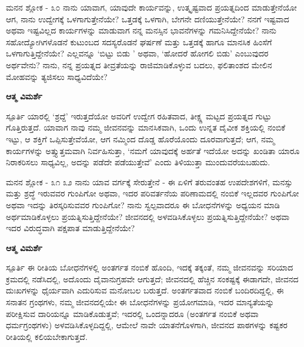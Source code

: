 \newpage
\begin{mananam}{\mananamfont ಮನನ ಶ್ಲೋಕ - ೩೦}
\mananamtext ನಾನು ಯಾವಾಗ, ಯಾವುದೇ ಕಾರ್ಯವನ್ನು, ಉತ್ಕೃಷ್ಟವಾದ ಪ್ರಯತ್ನದಿಂದ ಮಾಡುತ್ತೇನೆಯೋ ಆಗ, ನಾನು ಉದ್ವೇಗಕ್ಕೆ ಒಳಗಾಗುತ್ತೇನೆಯೇ? ಒತ್ತಡಕ್ಕೆ ಒಳಗಾಗಿ, ಬೇಗನೇ ದಣಿಯುತ್ತೇನೆಯೇ? ನನಗೆ ಇಷ್ಟವಾದ ಅಥವಾ ಇಷ್ಟವಿಲ್ಲದ ಕಾರ್ಯಗಳನ್ನು ಮಾಡುವಾಗ ನನ್ನ ಮನಸ್ಸಿನ ಭಾವನೆಗಳನ್ನು ಗಮನಿಸಿದ್ದೇನೆಯೇ? ನಾನು ಸಹೋದ್ಯೋಗಿಗಳೊಡನೆ ಕುಟುಂಬದ ಸದಸ್ಯರೊಡನೆ ಘರ್ಷಣೆ ಮತ್ತು ಒತ್ತಡಕ್ಕೆ ಹಾಗೂ ಮಾನಸಿಕ ಹಿಂಸೆಗೆ ಒಳಗಾಗುತ್ತಿದ್ದೇನೆಯೇ? ಎಲ್ಲವನ್ನೂ ‘ಬಿಟ್ಟು ಬಿಡು ’ ಅಥವಾ, ‘ಹೋದರೆ ಹೋಗಲಿ ಬಿಡು’ ಎಂಬುವುದರ ಅರ್ಥವೇನು? ನಾನು, ನನ್ನ ಪ್ರಯತ್ನದ ತೀವ್ರತೆಯನ್ನು  ರಾಜಿಮಾಡಿಕೊಳ್ಳುವ ಬದಲು, ಫಲಿತಾಂಶದ ಮೇಲಿನ ಮೋಹವನ್ನು ತ್ಯಜಿಸಲು ಸಾಧ್ಯವಿದೆಯೇ? 
\end{mananam}
\WritingHand\enspace\textbf{ಆತ್ಮ ವಿಮರ್ಶೆ}\\
\begin{inspiration}{\mananamfont ಸ್ಪೂರ್ತಿ}
\mananamtext ಯಾರಲ್ಲಿ ‘ಶ್ರದ್ದೆ’ ಇರುತ್ತದೆಯೋ ಅವರಿಗೆ ಉದ್ವೇಗ ರಹಿತವಾದ, ತೀಕ್ಷ್ಣ  ಮಟ್ಟದ ಪ್ರಯತ್ನದ ಗುಟ್ಟು ಗೊತ್ತಿರುತ್ತದೆ. ಯಾವಾಗ ನಾವು ನಮ್ಮ ಜೀವನವನ್ನು ಮಾನಸಿಕವಾಗಿ, ಒಂದು ಉನ್ನತ ದೈವೀಕ ಶಕ್ತಿಯಲ್ಲಿ ನಂಬಿಕೆ ಇಟ್ಟು, ಆ ಶಕ್ತಿಗೆ ಒಪ್ಪಿಸುತ್ತೇವೆಯೋ, ಆಗ ನಮ್ಮಿಂದ ದೊಡ್ಡ ಹೊರೆಯೊಂದು ದೂರವಾಗುತ್ತದೆ; ಆಗ, ನಮ್ಮ ಕಾರ್ಯಗಳನ್ನು ಅತ್ತ್ಯುತ್ತಮವಾಗಿ ನಿರ್ವಹಿಸುತ್ತಾ, ‘ನಮಗೆ ಯಾವುದಕ್ಕೆ ಅರ್ಹತೆ ಇದೆಯೋ ಅದನ್ನು ಖಂಡಿತಾ ಯಾರೂ ನಿರಾಕರಿಸಲು ಸಾಧ್ಯವಿಲ್ಲ, ಅದನ್ನು ಪಡೆದೇ ಪಡೆಯುತ್ತೇವೆ’ ಎಂದು ತಿಳಿಯುತ್ತಾ ಮುಂದುವರೆಯಬಹುದು.
\end{inspiration}
\newpage

\begin{mananam}{\mananamfont ಮನನ ಶ್ಲೋಕ - ೩೧ ೩೨}
\mananamtext ನಾನು ಯಾವ ವರ್ಗಕ್ಕೆ ಸೇರುತ್ತೇನೆ -  ಈ ಏಳಿಗೆ ತರುವಂತಹ ಉಪದೇಶಗಳಿಗೆ, ಮನಸ್ಸು ಮತ್ತು ಶ್ರದ್ಧೆ ಇರುವವರ ಗುಂಪಿಗೋ ಅಥವಾ, ಇದರ ಪರಿವರ್ತನೆಯ ಪರಿಣಾಮದಲ್ಲಿ ನಂಬಿಕೆ ಇಲ್ಲದವರ ಗುಂಪಿಗೋ ಅಥವಾ ಇದನ್ನು ತಿರಸ್ಕರಿಸುವವರ ಗುಂಪಿಗೋ? ನಾನು ಸ್ವಲ್ಪವಾದರೂ ಈ ಬೋಧನೆಗಳನ್ನು ಅಧ್ಯಯನ ಮಾಡಿ ಅರ್ಥಮಾಡಿಕೊಳ್ಳಲು ಪ್ರಯತ್ನಿಸುತ್ತಿದ್ದೇನೆಯೇ? ಜೀವನದಲ್ಲಿ ಅಳವಡಿಸಿಕೊಳ್ಳಲು ಪ್ರಯತ್ನಿಸುತ್ತಿದ್ದೇನೆಯೇ? ಅಥವಾ ಇದರ ವಿರುದ್ಧವಾಗಿ ಪಕ್ಷಪಾತ ಮಾಡುತ್ತಿದ್ದೇನೆಯೇ?
\end{mananam}
\WritingHand\enspace\textbf{ಆತ್ಮ ವಿಮರ್ಶೆ}\\
\begin{inspiration}{\mananamfont ಸ್ಪೂರ್ತಿ}
\small \mananamtext ಈ ರೀತಿಯ ಬೋಧನೆಗಳಲ್ಲಿ ಅಂತರ್ಗತ ನಂಬಿಕೆ ಹೊಂದಿ, ಇದಕ್ಕೆ ತಕ್ಕಂತೆ, ನಮ್ಮ ಜೀವನವನ್ನು ಸರಿಯಾದ ಕ್ರಮದಲ್ಲಿ ನಡೆಸಿದಲ್ಲಿ, ಅದೊಂದು ದೈವಾನುಗ್ರಹವೇ ಆಗುತ್ತದೆ; ಜೀವನದಲ್ಲಿ ಹೆಚ್ಚಿನ  ಸಂಕಷ್ಟಕ್ಕೆ ಈಡಾಗದೇ, ಜೀವನದ ದುಃಖಗಳನ್ನು ಧೈರ್ಯವಾಗಿ ಎದುರಿಸುವ ಮನೋಬಲ ಬರುತ್ತದೆ.  ಅಂತರ್ಗತವಾದ ನಂಬಿಕೆ ಬಂದಿರದಿದ್ದಲ್ಲಿ, ಈ ಸನಾತನ ಗ್ರಂಥಗಳು, ನಮ್ಮ ಜೀವನದಲ್ಲಿಯೇ ಈ ಬೋಧನೆಗಳನ್ನು ಪ್ರಯೋಗಮಾಡಿ, ಇದರ ಮಾನ್ಯತೆಯನ್ನು ಪರೀಕ್ಷಿಸುವ ದಾರಿಯನ್ನೂ ಮಾಡಿಕೊಡುತ್ತವೆ; ಇದರಲ್ಲಿ ಒಂದನ್ನಾದರೂ (ಅಂತರ್ಗತ ನಂಬಿಕೆ ಅಥವಾ ಧರ್ಮಗ್ರಂಥಗಳು) ಅಳವಡಿಸಿಕೊಳ್ಳದಿದ್ದಲ್ಲಿ, ಆಮೇಲೆ ನಾವೇ ಯಾತನೆಗೊಳಗಾಗಿ, ಜೀವನದ ಪಾಠಗಳನ್ನು ಕಷ್ಟಕರ ರೀತಿಯಲ್ಲಿ ಕಲಿಯಬೇಕಾಗುತ್ತದೆ. 
\end{inspiration}
\newpage

